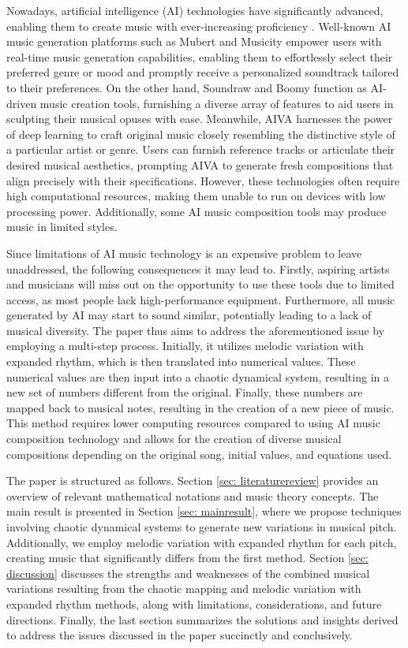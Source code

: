 \documentclass[11pt]{article}
\theoremstyle{definition}
\begin{document}
Nowadays, artificial intelligence (AI) technologies have significantly advanced, enabling them to create music with ever-increasing proficiency \cite{bonnici_music_2021}. 
Well-known AI music generation platforms such as Mubert \cite{mubert_website} and 
Musicity \cite{musicfy_website} empower users with real-time music generation capabilities, 
enabling them to effortlessly select their preferred genre or mood and promptly receive a personalized soundtrack tailored to their preferences. On the other hand, Soundraw \cite{soundraw_website} and Boomy \cite{boomy_website} function as AI-driven music creation tools, furnishing a diverse array of features to aid users in sculpting their musical opuses with ease. Meanwhile, AIVA \cite{aiva_website} harnesses the power of deep learning to craft original music closely resembling the distinctive style of a particular artist or genre. Users can furnish reference tracks or articulate their desired musical aesthetics, prompting AIVA to generate fresh compositions that align precisely with their specifications. However, these technologies often require high computational resources, making them unable to run on devices with low processing power. Additionally, some AI music composition tools may produce music in limited styles.

Since limitations of AI music technology is an expensive problem to leave unaddressed, the following consequences it may lead to. Firstly, aspiring artists and musicians will miss out on the opportunity to use these tools due to limited access, as most people lack high-performance equipment. Furthermore, all music generated by AI may start to sound similar, potentially leading to a lack of musical diversity. The paper thus aims to address the aforementioned issue by employing a multi-step process. Initially, it utilizes melodic variation with expanded rhythm, which is then translated into numerical values. These numerical values are then input into a chaotic dynamical system, resulting in a new set of numbers different from the original. Finally, these numbers are mapped back to musical notes, resulting in the creation of a new piece of music. This method requires lower computing resources compared to using AI music composition technology and allows for the creation of diverse musical compositions depending on the original song, initial values, and equations used.

The paper is structured as follows. Section \ref{sec: literaturereview} provides an overview of relevant mathematical notations and music theory concepts. 
The main result is presented in Section \ref{sec: mainresult}, where we propose techniques involving chaotic dynamical systems to generate new variations in musical pitch. 
Additionally, we employ melodic variation with expanded rhythm for each pitch, creating music that significantly differs from the first method. 
Section \ref{sec: discussion} discusses the strengths and weaknesses of the combined musical variations resulting from the chaotic mapping and melodic variation with expanded rhythm methods, along with limitations, considerations, and future directions. 
Finally, the last section summarizes the solutions and insights derived to address the issues discussed in the paper succinctly and conclusively.
\end{document}
